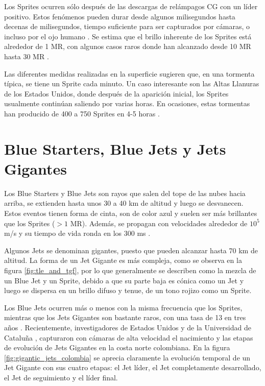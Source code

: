 \documentclass[12pt,oneside,openany,letter]{book}
\begin{document}
Los Sprites ocurren sólo después de las descargas de relámpagos CG con un líder positivo. Estos fenómenos pueden durar desde algunos milisegundos hasta decenas de milisegundos, tiempo suficiente para ser capturados por cámaras, o incluso por el ojo humano \cite{Maiorana2014}. Se estima que el brillo inherente de los Sprites está alrededor de 1 MR, con algunos casos raros donde han alcanzado desde 10 MR hasta 30 MR \cite{FullekrugEtal2006}. 

Las diferentes medidas realizadas en la superficie sugieren que, en una tormenta típica, se tiene un Sprite cada minuto. Un caso interesante son las Altas Llanuras de los Estados Unidos, donde después de la aparición inicial, los Sprites usualmente continúan saliendo por varias horas. En ocasiones, estas tormentas han producido de 400 a 750 Sprites en 4-5 horas \cite{FullekrugEtal2006}.

\section{Blue Starters, Blue Jets y Jets Gigantes}
Los Blue Starters y Blue Jets son rayos que salen del tope de las nubes hacia arriba, se extienden hasta unos 30 a 40 km de altitud y luego se desvanecen. Estos eventos tienen forma de cinta, son de color azul y suelen ser más brillantes que los Sprites ($>1$ MR). Adem\'as, se propagan con velocidades alrededor de $10^5$ m/s y su tiempo de vida ronda en los 300 ms \cite{DwyerUman2014}. 

Algunos Jets se denominan gigantes, puesto que pueden alcanzar hasta 70 km de altitud. La forma de un Jet Gigante es más compleja, como se observa en la figura \ref{fig:tle_and_tgf}, por lo que generalmente se describen como la mezcla de un Blue Jet y un Sprite, debido a que su parte baja es cónica como un Jet y luego se dispersa en un brillo difuso y tenue, de un tono rojizo como un Sprite. 

Los Blue Jets ocurren más o menos con la misma frecuencia que los Sprites, mientras que los Jets Gigantes son bastante raros, con una tasa de 13 en tres años \cite{chen2008}. Recientemente, investigadores de Estados Unidos y de la Universidad de Cataluña \cite{VanEtal2019}, capturaron con cámaras de alta velocidad el nacimiento y las etapas de evolución de Jets Gigantes en la costa norte colombiana. En la figura \ref{fig:gigantic_jets_colombia} se aprecia claramente la evolución temporal de un Jet Gigante con sus cuatro etapas: el Jet líder, el Jet completamente desarrollado, el Jet de seguimiento y el líder final. 
\end{document}
